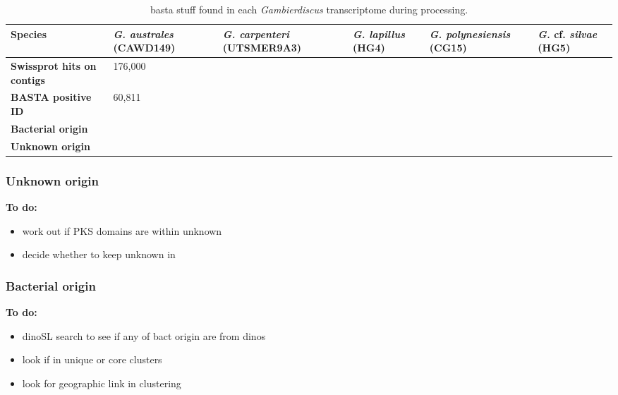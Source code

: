 \documentclass[12pt]{article}
\begin{document}
\begin{table}
\caption{basta stuff found in each \emph{Gambierdiscus} transcriptome during processing.}
\label{tbl:bastaTable}
\begin{tabular}{ | p{3cm} | p{2cm} | p{2.5cm} | p{2.5cm} | p{2cm} | p{2cm}|}
\hline
\textbf{Species}& \textit{G. australes} (CAWD149)& \emph{G. carpenteri} (UTSMER9A3)&\emph{G. lapillus} (HG4)&\emph{G. polynesiensis} (CG15)&\emph{G.} cf. \emph{silvae} (HG5)\\
\hline
\textbf{Swissprot hits on contigs}&176,000&&&&\\ %
\hline
\textbf{BASTA positive ID}&60,811&&&&\\ %
\hline
\textbf{Bacterial origin}&&&&&\\
\hline
\textbf{Unknown origin}&&&&&\\
\hline
\end{tabular}
\end{table}
\FloatBarrier
\newpage

\subsubsection*{Unknown origin}
\textbf{To do:}
\begin{itemize}
\item work out if PKS domains are within unknown
\item decide whether to keep unknown in 
\end{itemize}
\subsubsection*{Bacterial origin}
\textbf{To do:}
\begin{itemize}
\item dinoSL search to see if any of bact origin are from dinos
\item look if in unique or core clusters
\item look for geographic link in clustering
\end{itemize}
\end{document}

